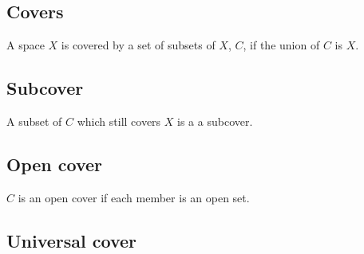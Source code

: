 
\subsection{Covers}

A space \(X\) is covered by a set of subsets of \(X\), \(C\), if the union of \(C\) is \(X\).

\subsection{Subcover}

A subset of \(C\) which still covers \(X\) is a a subcover.

\subsection{Open cover}

\(C\) is an open cover if each member is an open set.

\subsection{Universal cover}

